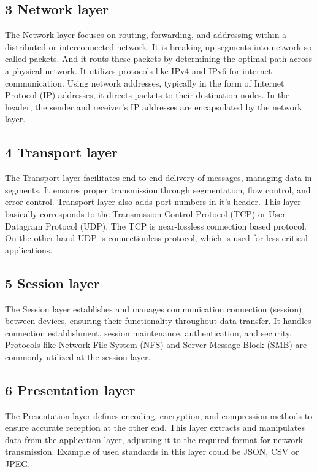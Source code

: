 \documentclass[conference]{IEEEtran}
\begin{document}
\subsection{3 Network layer}
The Network layer focuses on routing, forwarding, and addressing within a distributed or interconnected network. It is breaking up segments into network so called packets. And it routs these packets by determining the optimal path across a physical network. It utilizes protocols like IPv4 and IPv6 for internet communication. Using network addresses, typically in the form of Internet Protocol (IP) addresses, it directs packets to their destination nodes. In the header, the sender and receiver's IP addresses are encapsulated by the network layer.

\subsection{4 Transport layer}
The Transport layer facilitates end-to-end delivery of messages, managing data in segments. It ensures proper transmission through segmentation, flow control, and error control. Transport layer also adds port numbers in it's header. This layer basically corresponds to the Transmission Control Protocol (TCP) or User Datagram Protocol (UDP). The TCP is near-lossless connection based protocol. On the other hand UDP is connectionless protocol, which is used for less critical applications.

\subsection{5 Session layer}
The Session layer establishes and manages communication connection (session) between devices, ensuring their functionality throughout data transfer. It handles connection establishment, session maintenance, authentication, and security. Protocols like Network File System (NFS) and Server Message Block (SMB) are commonly utilized at the session layer.

\subsection{6 Presentation layer}
The Presentation layer defines encoding, encryption, and compression methods to ensure accurate reception at the other end. This layer extracts and manipulates data from the application layer, adjusting it to the required format for network transmission. Example of used standards in this layer could be JSON, CSV or JPEG.
\end{document}
